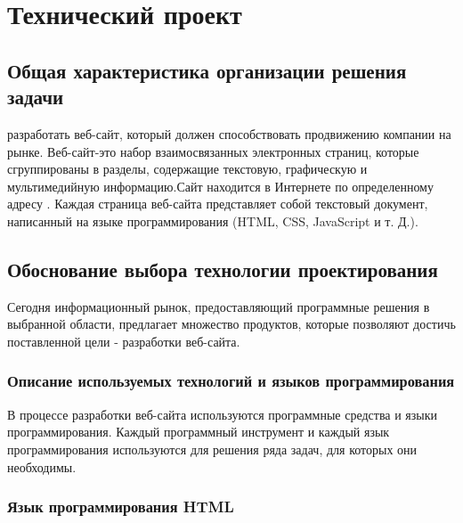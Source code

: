 \newsection
\section{Технический проект}
\subsection{Общая характеристика организации решения задачи}

разработать веб-сайт, который должен способствовать продвижению компании на рынке.
Веб-сайт-это набор взаимосвязанных электронных страниц, которые сгруппированы в разделы, содержащие текстовую, графическую и мультимедийную информацию.Сайт находится в Интернете по определенному адресу . Каждая страница веб-сайта представляет собой текстовый документ, написанный на языке программирования (HTML, CSS, JavaScript и т. Д.).

\subsection{Обоснование выбора технологии проектирования}

Сегодня информационный рынок, предоставляющий программные решения в выбранной области, предлагает множество продуктов, которые позволяют достичь поставленной цели - разработки веб-сайта.

\subsubsection{Описание используемых технологий и языков программирования}

В процессе разработки веб-сайта используются программные средства и языки программирования. Каждый программный инструмент и каждый язык программирования используются для решения ряда задач, для которых они необходимы.

\subsubsection{Язык программирования HTML}

